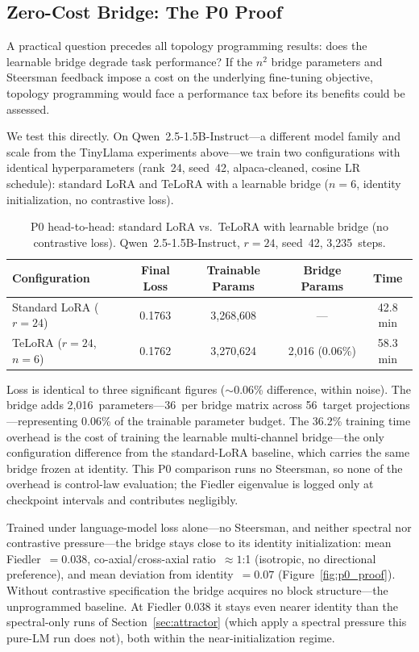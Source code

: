 \subsection{Zero-Cost Bridge: The P0 Proof}

A practical question precedes all topology programming results: does
the learnable bridge degrade task performance? If the $n^2$ bridge
parameters and Steersman feedback impose a cost on the underlying
fine-tuning objective, topology programming would face a performance
tax before its benefits could be assessed.

We test this directly. On Qwen~2.5-1.5B-Instruct---a different model
family and scale from the TinyLlama experiments above---we train two
configurations with identical hyperparameters (rank~24, seed~42,
alpaca-cleaned, cosine LR schedule): standard LoRA and TeLoRA with a
learnable bridge ($n = 6$, identity initialization, no contrastive
loss).

\begin{table}[H]
\centering
\caption{P0 head-to-head: standard LoRA vs.\ TeLoRA with learnable
  bridge (no contrastive loss). Qwen~2.5-1.5B-Instruct, $r = 24$,
  seed~42, 3{,}235~steps.}
\label{tab:p0}
\small
\begin{tabular}{lcccc}
\toprule
Configuration & Final Loss & Trainable Params & Bridge Params & Time \\
\midrule
Standard LoRA ($r = 24$) & 0.1763 & 3{,}268{,}608 & --- & 42.8 min \\
TeLoRA ($r = 24$, $n = 6$) & 0.1762 & 3{,}270{,}624 & 2{,}016 (0.06\%) & 58.3 min \\
\bottomrule
\end{tabular}
\end{table}

Loss is identical to three significant figures ($\sim$0.06\% difference,
within noise). The bridge adds 2{,}016~parameters---36~per bridge
matrix across 56~target projections---representing 0.06\% of the
trainable parameter budget. The 36.2\% training time overhead is the
cost of training the learnable multi-channel bridge---the only
configuration difference from the standard-LoRA baseline, which carries
the same bridge frozen at identity. This P0 comparison runs no
Steersman, so none of the overhead is control-law evaluation; the
Fiedler eigenvalue is logged only at checkpoint intervals and
contributes negligibly.

Trained under language-model loss alone---no Steersman, and neither
spectral nor contrastive pressure---the bridge stays close to its
identity initialization: mean Fiedler~$= 0.038$, co-axial/cross-axial
ratio~$\approx 1$:1 (isotropic, no directional preference), and mean
deviation from identity~$= 0.07$ (Figure~\ref{fig:p0_proof}). Without
contrastive specification the bridge acquires no block structure---the
unprogrammed baseline. At Fiedler 0.038 it stays even nearer identity
than the spectral-only runs of Section~\ref{sec:attractor} (which apply
a spectral pressure this pure-LM run does not), both within the
near-initialization regime.

